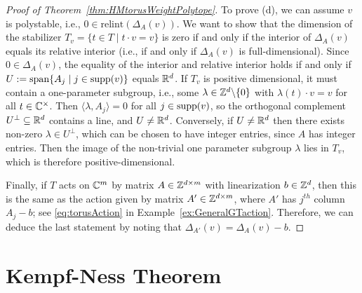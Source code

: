 \begin{proof}[Proof of Theorem~\ref{thm:HMtorusWeightPolytope}]
	To prove (d), we can assume $v$ is polystable, i.e., $0 \in \mathrm{relint}(\Delta_A(v))$. We want to show that the dimension of the stabilizer $T_v = \{ t \in T \mid t \cdot v = v\}$ is zero if and only if the interior of $\Delta_A(v)$ equals its relative interior (i.e., if and only if $\Delta_A(v)$ is full-dimensional). Since $0 \in \Delta_A(v)$, the equality of the interior and relative interior holds if and only if $U:= \mathrm{span} \{ A_j \mid j \in \operatorname{supp}(v) \}$ equals $\mathbb R^d$. If $T_v$ is positive dimensional, it must contain a one-parameter subgroup, i.e., some $\lambda \in \mathbb Z^d \backslash \{0\}$ with $\lambda(t) \cdot v = v $ for all $t \in \mathbb C^\times$. Then $\langle \lambda, A_j \rangle = 0$ for all $j \in \operatorname{supp}(v)$, so the orthogonal complement $U^{\perp} \subseteq \mathbb R^d$ contains a line, and $U \neq \mathbb R^d$. Conversely, if $U \neq \mathbb R^d$ then there exists non-zero $\lambda \in U^\perp$, which can be chosen to have integer entries, since $A$ has integer entries. Then the image of the non-trivial one parameter subgroup $\lambda$ lies in $T_v$, which is therefore positive-dimensional.
	
	Finally, if $T$ acts on $\mathbb C^m$ by matrix $A \in \mathbb Z^{d \times m}$ with linearization $b \in \mathbb Z^d$, then this is the same as the action given by matrix $A' \in \mathbb Z^{d \times m}$, where $A'$ has $j^{th}$ column $A_j - b$; see \eqref{eq:torusAction} in Example~\ref{ex:GeneralGTaction}. Therefore, we can deduce the last statement by noting that $\Delta_{A'}(v) = \Delta_A(v) - b$.
\end{proof}












\section{Kempf-Ness Theorem} \label{sec:KempfNess}



